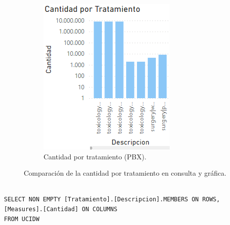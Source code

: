\documentclass{article}
\begin{document}
\begin{figure}[H]
\begin{subfigure}[b]{0.4\textwidth}
		\includegraphics[width=\textwidth]{images/cantidad_tratamiento_pbx.png}
		\caption{Cantidad por tratamiento (PBX).}
		\label{fig:tratamiento_pbx}
	\end{subfigure}
	\caption{Comparación de la cantidad por tratamiento en consulta y gráfica.}
	\label{fig:tratamiento_comparacion}
\end{figure}

\begin{lstlisting}[style=ddlstyle, label=lst:consulta4, caption=Cantidad por Tratamiento]

SELECT NON EMPTY [Tratamiento].[Descripcion].MEMBERS ON ROWS, 
[Measures].[Cantidad] ON COLUMNS
FROM UCIDW
\end{lstlisting}
\end{document}
